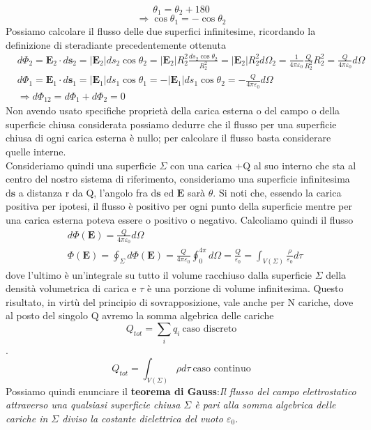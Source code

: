 \documentclass[10pt,a4paper]{article}
\begin{document}
\[\theta_1 = \theta_2 + 180\]
\[\Rightarrow \cos\theta_1 = -\cos\theta_2\]
Possiamo calcolare il flusso delle due superfici infinitesime, ricordando la definizione di steradiante precedentemente ottenuta
\begin{align*}
	&d\Phi_2 = \mathbf{E}_2\cdot d\mathbf{s}_2 = |\mathbf{E}_2| ds_2 \cos\theta_2 = |\mathbf{E}_2| R_2^2 \frac{ ds_2 \cos\theta_2}{R_2^2} = |\mathbf{E}_2| R_2^2 d\Omega_2 =\frac{1}{4\pi\varepsilon_0}\frac{Q}{R^2_2}R^2_2= \frac{Q}{4\pi\varepsilon_0}d\Omega \\
	&d\Phi_1 = \mathbf{E}_1\cdot d\mathbf{s}_1 = |\mathbf{E}_1| ds_1 \cos\theta_1 = -|\mathbf{E}_1| ds_1 \cos\theta_2 = -\frac{Q}{4\pi\varepsilon_0}d\Omega\\
	&\Rightarrow d\Phi_{12} = d\Phi_1 + d\Phi_2 = 0
\end{align*}
Non avendo usato specifiche proprietà della carica esterna o del campo o della superficie chiusa considerata possiamo dedurre che il flusso per una superficie chiusa di ogni carica esterna è nullo; per calcolare il flusso basta considerare quelle interne.\\
Consideriamo quindi una superficie \(\Sigma\) con una carica +Q al suo interno che sta al centro del nostro sistema di riferimento, consideriamo una superficie infinitesima d$\mathbf{s}$ a distanza r da Q, l'angolo fra d$\mathbf{s}$ ed $\mathbf{E}$ sarà $\theta$. Si noti che, essendo la carica positiva per ipotesi, il flusso è positivo per ogni punto della superficie mentre per una carica esterna poteva essere o positivo o negativo. Calcoliamo quindi il flusso
\begin{align*}
	&d\Phi(\mathbf{E}) = \frac{Q}{4\pi\varepsilon_0}d\Omega\\
	&\Phi(\mathbf{E}) = \oint_{\Sigma} d\Phi(\mathbf{E}) = \frac{Q}{4\pi\varepsilon_0}\oint_0^{4\pi}d\Omega = \frac{Q}{\varepsilon_0} = \int_{V(\Sigma)}\frac{\rho}{\varepsilon_0}d\tau
	\end{align*}
dove l'ultimo è un'integrale su tutto il volume racchiuso dalla superficie $\Sigma$ della densità volumetrica di carica e $\tau$ è una porzione di volume infinitesima. Questo risultato, in virtù del principio di sovrapposizione, vale anche per N cariche, dove al posto del singolo Q avremo la somma algebrica delle cariche 
\[Q_{tot} = \sum_iq_i\ \text{caso discreto}\]. 
\[Q_{tot} = \int_{V(\Sigma)}\rho d\tau\ \text{caso continuo}\]
Possiamo quindi enunciare il \textbf{teorema di Gauss}:\textit{Il flusso del campo elettrostatico attraverso una qualsiasi superficie chiusa $\Sigma$ è pari alla somma algebrica delle cariche in \(\Sigma\) diviso la costante dielettrica del vuoto $\varepsilon_0$.}
\end{document}
